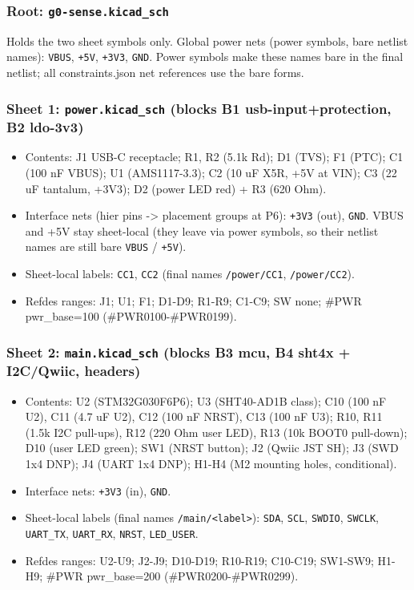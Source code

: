 \documentclass[11pt,a4paper]{article}
\begin{document}
\subsubsection*{Root: \texttt{g0-sense.kicad\_sch}}
Holds the two sheet symbols only. Global power nets (power symbols, bare netlist names): \texttt{VBUS}, \texttt{+5V}, \texttt{+3V3}, \texttt{GND}. Power symbols make these names bare in the final netlist; all constraints.json net references use the bare forms.

\subsubsection*{Sheet 1: \texttt{power.kicad\_sch} (blocks B1 usb-input+protection, B2 ldo-3v3)}
\begin{itemize}
\item Contents: J1 USB-C receptacle; R1, R2 (5.1k Rd); D1 (TVS); F1 (PTC);
C1 (100 nF VBUS); U1 (AMS1117-3.3); C2 (10 uF X5R, +5V at VIN);
C3 (22 uF tantalum, +3V3); D2 (power LED red) + R3 (620 Ohm).
\item Interface nets (hier pins -\textgreater{} placement groups at P6): \texttt{+3V3} (out),
\texttt{GND}. VBUS and +5V stay sheet-local (they leave via power symbols, so
their netlist names are still bare \texttt{VBUS} / \texttt{+5V}).
\item Sheet-local labels: \texttt{CC1}, \texttt{CC2} (final names \texttt{/power/CC1}, \texttt{/power/CC2}).
\item Refdes ranges: J1; U1; F1; D1-D9; R1-R9; C1-C9; SW none; \#PWR pwr\_base=100
(\#PWR0100-\#PWR0199).
\end{itemize}
\subsubsection*{Sheet 2: \texttt{main.kicad\_sch} (blocks B3 mcu, B4 sht4x + I2C/Qwiic, headers)}
\begin{itemize}
\item Contents: U2 (STM32G030F6P6); U3 (SHT40-AD1B class); C10 (100 nF U2),
C11 (4.7 uF U2), C12 (100 nF NRST), C13 (100 nF U3); R10, R11 (1.5k I2C
pull-ups), R12 (220 Ohm user LED), R13 (10k BOOT0 pull-down); D10 (user LED green); SW1 (NRST
button); J2 (Qwiic JST SH); J3 (SWD 1x4 DNP); J4 (UART 1x4 DNP);
H1-H4 (M2 mounting holes, conditional).
\item Interface nets: \texttt{+3V3} (in), \texttt{GND}.
\item Sheet-local labels (final names \texttt{/main/\textless{}label\textgreater{}}): \texttt{SDA}, \texttt{SCL}, \texttt{SWDIO},
\texttt{SWCLK}, \texttt{UART\_TX}, \texttt{UART\_RX}, \texttt{NRST}, \texttt{LED\_USER}.
\item Refdes ranges: U2-U9; J2-J9; D10-D19; R10-R19; C10-C19; SW1-SW9; H1-H9;
\#PWR pwr\_base=200 (\#PWR0200-\#PWR0299).
\end{itemize}
\end{document}
